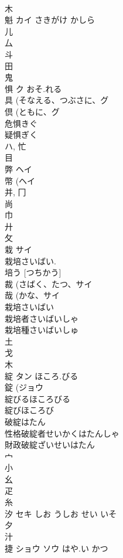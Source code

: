 \documentclass[8pt]{extreport}
\begin{document}
\begin{CJK}{UTF8}{min}
\\	木 
\\	魁	カイ	さきがけ かしら	
\\	儿 
\\	厶 
\\	斗 
\\	田 
\\	鬼 
\\	惧	ク	おそ.れる	
\\	具 (そなえる、つぶさに、グ 
\\	倶 (ともに、グ 
\\	危惧きぐ 
\\	疑惧ぎく 
\\	ハ, 忙 
\\	目 
\\	弊	ヘイ		
\\	幣 (ヘイ 
\\	并, 冂 
\\	尚 
\\	巾 
\\	廾 
\\	攵 
\\	栽	サイ		
\\	栽培さいばい. 
\\	培う [つちかう] 
\\	裁 (さばく、たつ、サイ 
\\	哉 (かな、サイ 
\\	栽培さいばい 
\\	栽培者さいばいしゃ 
\\	栽培種さいばいしゅ 
\\	土 
\\	戈 
\\	木 
\\	綻	タン	ほころ.びる	
\\	錠 (ジョウ 
\\	綻びるほころびる 
\\	綻びほころび 
\\	破綻はたん 
\\	性格破綻者せいかくはたんしゃ 
\\	財政破綻ざいせいはたん 
\\	宀 
\\	小 
\\	幺 
\\	疋 
\\	糸 
\\	汐	セキ	しお うしお せい いそ	
\\	夕 
\\	汁 
\\	捷	ショウ ソウ	はや.い かつ	

\end{CJK}
\end{document}
